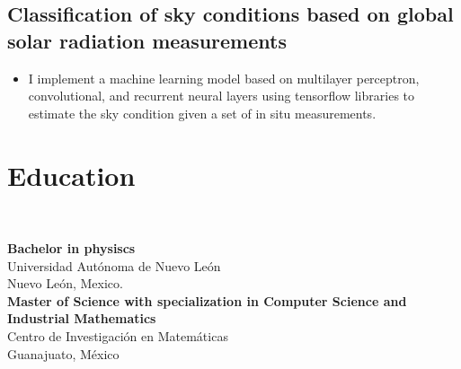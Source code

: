 \documentclass[a3paper]{adcv_color}
\begin{document}
\begin{addmargin}[0.5em]{0.5em}
	\subsection{Classification of sky conditions based on global solar radiation measurements}
	\begin{itemize}
		\item I implement a machine learning model based on multilayer perceptron, convolutional, and recurrent neural layers using tensorflow libraries to estimate the sky condition given a set of in situ measurements.
	\end{itemize}
\end{addmargin}
\begin{minipage}{0.35\linewidth}
	\section{Education}\\
	\begin{addmargin}[0.5em]{0.5em}

		\textbf{Bachelor in physiscs}\\
		Universidad Autónoma de Nuevo León\\
		Nuevo León, Mexico.\\

		\textbf{Master of Science with specialization in Computer Science and Industrial Mathematics}\\
		Centro de Investigación en Matemáticas\\
		Guanajuato, México
	\end{addmargin}
\end{minipage}
\end{document}

